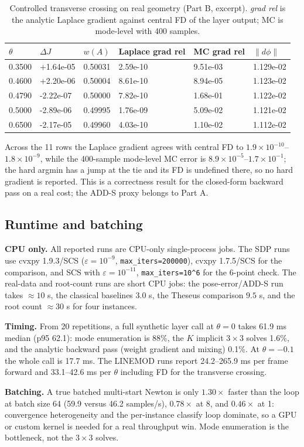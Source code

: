 \begin{table}[t]
\centering
\caption{Controlled transverse crossing on real geometry (Part B, excerpt). \emph{grad rel} is the analytic Laplace gradient against central FD of the layer output; MC is mode-level with 400 samples.}
\label{tab:partb}
\scriptsize
\setlength{\tabcolsep}{2.5pt}
\begin{tabular}{@{}l l l l l l@{}}
\toprule
$\theta$ & $\Delta J$ & $w(A)$ & Laplace grad rel & MC grad rel & $\|d\phi\|$\\
\midrule
0.3500 & +1.64e-05 & 0.50031 & 2.59e-10 & 9.51e-03 & 1.129e-02\\
0.4600 & +2.20e-06 & 0.50004 & 8.61e-10 & 8.94e-05 & 1.123e-02\\
0.4790 & -2.22e-07 & 0.50000 & 7.82e-10 & 1.68e-01 & 1.122e-02\\
0.5000 & -2.89e-06 & 0.49995 & 1.76e-09 & 5.09e-02 & 1.121e-02\\
0.6500 & -2.17e-05 & 0.49960 & 4.03e-10 & 1.10e-02 & 1.112e-02\\
\bottomrule
\end{tabular}
\end{table}

Across the 11 rows the Laplace gradient agrees with central FD to $1.9\times10^{-10}$--$1.8\times10^{-9}$, while the 400-sample mode-level MC error is $8.9\times10^{-5}$--$1.7\times10^{-1}$; the hard argmin has a jump at the tie and its FD is undefined there, so no hard gradient is reported. This is a correctness result for the closed-form backward pass on a real cost; the ADD-S proxy belongs to Part A.

\subsection{Runtime and batching}\label{sec:compute}

\textbf{CPU only.} All reported runs are CPU-only single-process jobs. The SDP runs use cvxpy 1.9.3/SCS ($\varepsilon=10^{-9}$, \texttt{max\_iters=200000}), cvxpy 1.7.5/SCS for the comparison, and SCS with $\varepsilon=10^{-11}$, \texttt{max\_iters=10\textasciicircum 6} for the 6-point check. The real-data and root-count runs are short CPU jobs: the pose-error/ADD-S run takes $\approx10$ s, the classical baselines $3.0$ s, the Theseus comparison $9.5$ s, and the root count $\approx30$ s for four instances.

\textbf{Timing.} From 20 repetitions, a full synthetic layer call at $\theta=0$ takes 61.9 ms median (p95 62.1): mode enumeration is 88\%, the $K$ implicit $3\times3$ solves 1.6\%, and the analytic backward pass (weight gradient and mixing) 0.1\%. At $\theta=-0.1$ the whole call is 17.7 ms. The LINEMOD runs report 24.2--265.9 ms per frame forward and 33.1--42.6 ms per $\theta$ including FD for the transverse crossing.

\textbf{Batching.} A true batched multi-start Newton is only $1.30\times$ faster than the loop at batch size 64 (59.9 versus 46.2 samples/s), $0.78\times$ at 8, and $0.46\times$ at 1: convergence heterogeneity and the per-instance classify loop dominate, so a GPU or custom kernel is needed for a real throughput win. Mode enumeration is the bottleneck, not the $3\times3$ solves.
